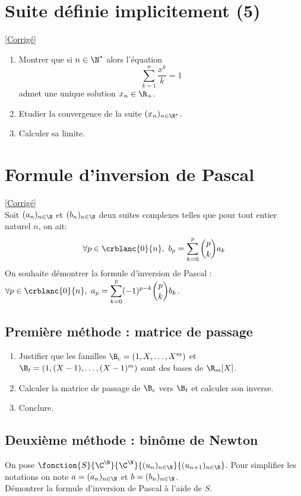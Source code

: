 \documentclass{book}
\begin{document}
	\section{Suite définie implicitement (5) }
	\textcolor{blue}{\hyperref[sec:suite-definie-implicitement-5-etoile3]{[Corrigé]}}\\
	\label{Suite définie implicitement 5}
	\begin{enumerate}[leftmargin=*]
		\item Montrer que si $n\in \N^*$ alors l'équation
		$$\sum_{k=1}^n\frac{x^k}{k}=1$$
		admet une unique solution $x_n\in \R_+$.
		\item Etudier la convergence de la suite $(x_n)_{n\in \N^*}$.
		\item Calculer sa limite.
	\end{enumerate}
	
	\section{Formule d'inversion de Pascal}
	\textcolor{blue}{\hyperref[sec:formule-dinversion-de-pascal-etoile2]{[Corrigé]}}\\
	\label{Formule d'inversion de Pascal}
	Soit $(a_n)_{n\in \N}$ et $(b_n)_{n\in \N}$ deux suites complexes telles que pour tout entier naturel $n$, on ait: $$\forall p\in\crblanc{0}{n},\ b_p=\displaystyle\sum\limits_{k=0}^p\binom{p}{k}a_k$$
	On souhaite démontrer la formule d'inversion de Pascal : $\forall p\in \crblanc{0}{n},\ a_p=\displaystyle\sum\limits_{k=0}^p(-1)^{p-k}\binom{p}{k}b_k$.
	
	\subsection{Première méthode : matrice de passage }
	\begin{enumerate}
		\item Justifier que les familles $\B_c=(1,X,\dots,X^m)$ et $\B_t=(1,(X-1),\dots,(X-1)^m)$ sont des bases de $\R_m[X]$.
		\item Calculer la matrice de passage de $\B_c$ vers $\B_t$ et calculer son inverse.
		\item Conclure.
	\end{enumerate}
	
	\subsection{Deuxième méthode : binôme de Newton }
	On pose $\fonction{S}{\C^\N}{\C^\N}{(u_n)_{n\in \N}}{(u_{n+1})_{n\in \N}}$. Pour simplifier les notations on note $a=(a_n)_{n\in \N}$ et $b=(b_n)_{n\in \N}$.\\
	Démontrer la formule d'inversion de Pascal à l'aide de $S$.
	
\end{document}
